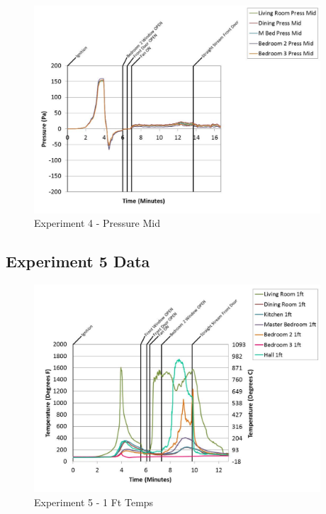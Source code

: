 \documentclass{article}
\begin{document}
\begin{appendices}
	\begin{figure}[h!]
		\centering
		\includegraphics[height=3.05in]{0_Images/Results_Charts/Exp_4_Charts/PressureMid.pdf}
		\caption{Experiment 4 - Pressure Mid}
	\end{figure}
 
	\clearpage

		\clearpage
\clearpage		\large
\subsection{Experiment 5 Data} \label{App:Exp5Results} 

	\begin{figure}[h!]
		\centering
		\includegraphics[height=3.05in]{0_Images/Results_Charts/Exp_5_Charts/1FtTemps.pdf}
		\caption{Experiment 5 - 1 Ft Temps}
	\end{figure}
 


\end{appendices}
\end{document}
